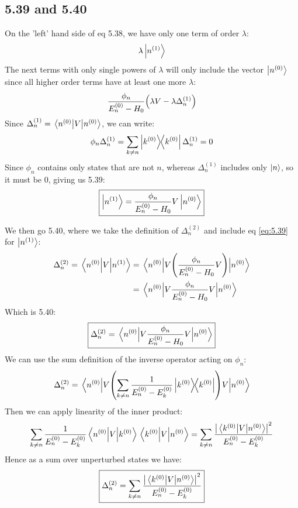 \documentclass[12pt]{article}
\begin{document}
\subsection{5.39 and 5.40}
On the 'left' hand side of eq 5.38, we have only one term of order $\lambda$:
\begin{align*}
  \lambda\ket{n^{(1)}}
\end{align*}
The next terms with only single powers of $\lambda$ will only include the vector $\ket{n^{(0)}}$ since all higher order terms have at least one more $\lambda$:
\begin{align*}
  \frac{\phi_n}{E_n^{(0)}-H_0}\qty(\lambda V-\lambda\Delta_n^{(1)})
\end{align*}
Since $\Delta_n^{(1)}=\mel{n^{(0)}}{V}{n^{(0)}}$, we can write:
\begin{align*}
  \phi_n\Delta_n^{(1)}=\sum_{k\neq n}\dyad{k^{(0)}}\Delta_n^{(1)}=0
\end{align*}
Since $\phi_n$ contains only states that are not $n$, whereas $\Delta_n^{(1)}$ includes only $\ket{n}$, so it must be $0$, giving us 5.39:
\begin{align}
  \label{eq:5.39}
  \boxed{\ket{n^{(1)}}=\frac{\phi_n}{E_n^{(0)}-H_0}V\ket{n^{(0)}}}
\end{align}

We then go 5.40, where we take the definition of $\Delta_n^{(2)}$ and include eq \eqref{eq:5.39} for $\ket{n^{(1)}}$:
\begin{align*}
  \Delta_n^{(2)}=\mel{n^{(0)}}{V}{n^{(1)}}
  &=\mel{n^{(0)}}{V\qty(\frac{\phi_n}{E_n^{(0)}-H_0}V)}{n^{(0)}}\\
  &=\mel{n^{(0)}}{V\frac{\phi_n}{E_n^{(0)}-H_0}V}{n^{(0)}}
\end{align*}
Which is 5.40:
\begin{align}
  \boxed{\Delta_n^{(2)}=\mel{n^{(0)}}{V\frac{\phi_n}{E_n^{(0)}-H_0}V}{n^{(0)}}}
\end{align}
We can use the sum definition of the inverse operator acting on $\phi_n$:
\begin{align*}
  \Delta_n^{(2)}=\mel{n^{(0)}}{V\qty(\sum_{k\neq n}
    \frac1{E_n^{(0)}-E_k^{(0)}}\dyad{k^{(0)}})V}{n^{(0)}}
\end{align*}
Then we can apply linearity of the inner product:
\begin{align*}
  \sum_{k\neq n}\frac1{E_n^{(0)}-E_k^{(0)}}
  \mel{n^{(0)}}{V}{k^{(0)}}\mel{k^{(0)}}{V}{n^{(0)}}=
  \sum_{k\neq n}\frac{\abs{\mel{k^{(0)}}{V}{n^{(0)}}}^2}{E_n^{(0)}-E_k^{(0)}}
\end{align*}
Hence as a sum over unperturbed states we have:
\begin{align}
  \boxed{\Delta_n^{(2)}=
  \sum_{k\neq n}\frac{\abs{\mel{k^{(0)}}{V}{n^{(0)}}}^2}{E_n^{(0)}-E_k^{(0)}}}
\end{align}
\end{document}
